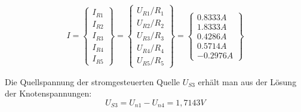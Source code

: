 \documentclass[11pt]{scrartcl}
\begin{document}
            \begin{equation*}
              \renewcommand{\arraystretch}{1.25}
              I = \left\{ \begin{array}{c}
                            I_{R1} \\
                            I_{R2} \\
                            I_{R3} \\
                            I_{R4} \\
                            I_{R5}
                          \end{array}\right\} =
                        \left\{ \begin{array}{c}
                                  U_{R1} / R_1 \\
                                  U_{R2} / R_2 \\
                                  U_{R3} / R_3 \\
                                  U_{R4} / R_4 \\
                                  U_{R5} / R_5
                                \end{array}\right\} =
                              \left\{ \begin{array}{c}
                                        0.8333 \unit{A} \\
                                        1.8333 \unit{A} \\
                                        0.4286 \unit{A} \\
                                        0.5714 \unit{A} \\
                                        -0.2976 \unit{A}
                                      \end{array}\right\}
                                  \end{equation*}

                                  Die Quellspannung der stromgesteuerten Quelle $U_{S3}$ erhält man aus der Lösung der Knotenspannungen:
                                  \begin{equation*}
                                    U_{S3} = U_{n1} - U_{n4} = 1,7143 \unit{V}
                                  \end{equation*}
\end{document}
